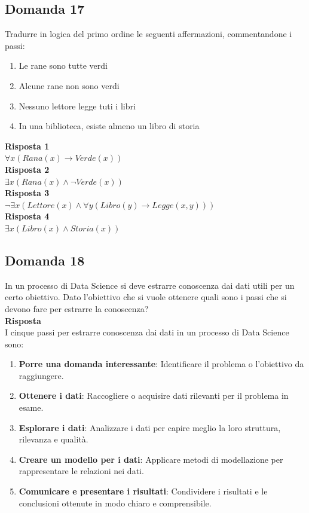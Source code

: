 \documentclass[../main.tex]{subfiles}
\begin{document}
	\subsection{Domanda 17}
	Tradurre in logica del primo ordine le seguenti affermazioni, commentandone i passi:
	\begin{enumerate}
		\item Le rane sono tutte verdi 
		\item Alcune rane non sono verdi 
		\item Nessuno lettore legge tuti i libri 
		\item In una biblioteca, esiste almeno un libro di storia
	\end{enumerate}
	\textbf{Risposta 1}\\
	$\forall x \left( Rana(x) \to Verde(x) \right)$\\
	\textbf{Risposta 2}\\
	$\exists x \left( Rana(x) \land \neg Verde(x) \right)$\\
	\textbf{Risposta 3}\\
	$\neg \exists x \left( Lettore(x) \land \forall y \left( Libro(y) \to Legge(x, y) \right) \right)$\\
	\textbf{Risposta 4}\\
	$\exists x \left( Libro(x) \land Storia(x) \right)$
	\subsection{Domanda 18}
	In un processo di Data Science si deve estrarre conoscenza dai dati utili per un certo obiettivo. Dato l’obiettivo che si vuole ottenere quali sono i passi che si devono fare per estrarre la conoscenza?\\
	\textbf{Risposta}\\
	I cinque passi per estrarre conoscenza dai dati in un processo di Data Science sono:
	\begin{enumerate}
		\item \textbf{Porre una domanda interessante}: Identificare il problema o l'obiettivo da raggiungere.
		\item \textbf{Ottenere i dati}: Raccogliere o acquisire dati rilevanti per il problema in esame.
		\item \textbf{Esplorare i dati}: Analizzare i dati per capire meglio la loro struttura, rilevanza e qualità.
		\item \textbf{Creare un modello per i dati}: Applicare metodi di modellazione per rappresentare le relazioni nei dati.
		\item \textbf{Comunicare e presentare i risultati}: Condividere i risultati e le conclusioni ottenute in modo chiaro e comprensibile.
	\end{enumerate}
\end{document}
